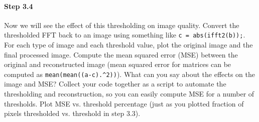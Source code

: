 \paragraph{Step 3.4} Now we will see the effect of this thresholding
on image quality. Convert the thresholded FFT back to an image using
something like \verb|c = abs(ifft2(b));|. For each type of image and
each threshold value, plot the original image and the final processed
image. Compute the mean squared error (MSE) between the original and
reconstructed image (mean squared error for matrices can be computed
as \verb|mean(mean((a-c).^2))|).  What can you say about the effects
on the image and MSE?  Collect your code together as a script to
automate the thresholding and reconstruction, so you can easily
compute MSE for a number of thresholds. Plot MSE vs. threshold
percentage (just as you plotted fraction of pixels thresholded
vs. threshold in step 3.3).

